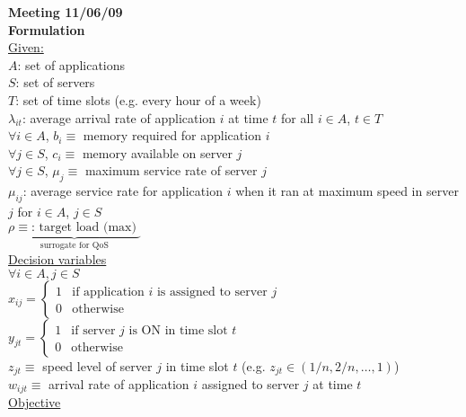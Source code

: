 \documentclass[11pt,english]{article}
\begin{document}
\newpage
{\Large \textbf{Meeting 11/06/09}}\\
\linebreak
\textbf{Formulation} \\
\linebreak
\underline{Given:}\\
$A$: set of applications\\
$S$: set of servers\\
$T$: set of time slots (e.g. every hour of a week)\\
$\lambda_{it}$: average arrival rate of application $i$ at time $t$ for all $i \in A$, $t \in T$\\
$\forall i \in A$, $b_i \equiv$ memory required for application $i$\\
$\forall j \in S$, $c_i \equiv$ memory available on server $j$\\
$\forall j \in S$, $\mu_j \equiv$ maximum service rate of server $j$\\
$\mu_{ij}$: average service rate for application $i$ when it ran at maximum speed in server $j$ for $i \in A$, $j\in S$\\
$\underbrace{\rho \equiv\textrm{: target load (max) }}_{\textrm{surrogate for QoS}}$\\
\linebreak
\underline{Decision variables}\\
$\forall i\in A, j\in S$\\
$  x_{ij}= \left\{ \begin{array}{ll}
      1 & \textrm{if application $i$ is assigned to server $j$} \\
      0 & \textrm{otherwise}
      \end{array} \right.
$\\
$
  y_{jt}= \left\{ \begin{array}{ll}
      1 & \textrm{if server $j$ is ON in time slot $t$} \\
      0 & \textrm{otherwise}
      \end{array} \right.
$\\
$z_{jt} \equiv$ speed level of server $j$ in time slot $t$ (e.g. $z_{jt} \in (1/n, 2/n, \ldots, 1)$)\\
$w_{ijt} \equiv$ arrival rate of application $i$ assigned to server $j$ at time $t$\\
\linebreak
\underline{Objective}\\
\end{document}
